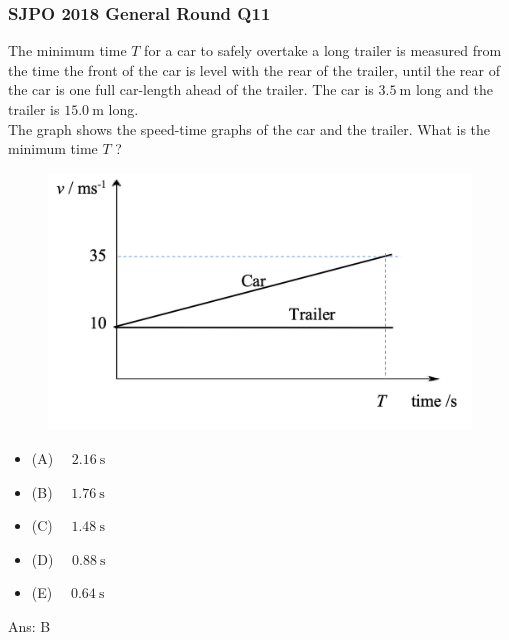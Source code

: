 \documentclass{article}
\begin{document}
\subsubsection{SJPO 2018 General Round Q11}
The minimum time $T$ for a car to safely overtake a long trailer is measured from the time the front of the car is level with the rear of the trailer, until the rear of the car is one full car-length ahead of the trailer. The car is $3.5 \mathrm{~m}$ long and the trailer is $15.0 \mathrm{~m}$ long.\\[10pt]
The graph shows the speed-time graphs of the car and the trailer. What is the minimum time $T$ ?\\
{
\begin{figure}
\includegraphics[width=1.0\linewidth]{images/sjpo2018q11.png}
\end{figure}
\begin{itemize}
\item[] (A) $\quad 2.16 \mathrm{~s}$
\item[] (B) $\quad 1.76 \mathrm{~s}$
\item[] (C) $\quad 1.48 \mathrm{~s}$
\item[] (D) $\quad 0.88 \mathrm{~s}$
\item[] (E) $\quad 0.64 \mathrm{~s}$
\end{itemize}
Ans: \ifpaper B \fi
}
\newpage \clearpage
\end{document}
